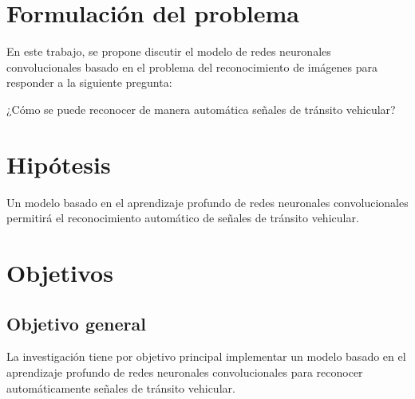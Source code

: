 \section{Formulación del problema}

  En este trabajo, se propone discutir el modelo de redes neuronales convolucionales basado en el problema del reconocimiento de imágenes para responder a la siguiente pregunta:
 \begin{center} 
     ¿Cómo se puede reconocer de manera automática señales de tránsito vehicular?
 \end{center}

\section{Hipótesis}
	 Un modelo basado en el aprendizaje profundo de redes neuronales convolucionales permitirá el reconocimiento automático de señales de tránsito vehicular.



\section{Objetivos}
	\subsection{Objetivo general}
	La investigación tiene por objetivo principal implementar un modelo basado en el aprendizaje profundo de redes neuronales convolucionales para reconocer automáticamente señales de tránsito vehicular.
	
	\vskip 0.2cm
		
